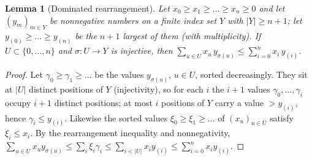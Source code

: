 \documentclass[11pt]{article}
\newtheorem{lemma}[theorem]{Lemma}
\theoremstyle{definition}
\theoremstyle{remark}
\begin{document}
\begin{lemma}[Dominated rearrangement]\label{lem:rearr}
Let $x_0\ge x_1\ge\dots\ge x_n\ge0$ and let $(y_m)_{m\in Y}$ be nonnegative numbers on a finite index set $Y$ with $|Y|\ge n+1$; let
$y_{(0)}\ge\dots\ge y_{(n)}$ be the $n+1$ largest of them (with multiplicity). If $U\subset\{0,\dots,n\}$ and $\sigma:U\to Y$ is injective, then
$\sum_{u\in U}x_u\,y_{\sigma(u)}\le\sum_{i=0}^nx_i\,y_{(i)}$.
\end{lemma}
\begin{proof}
Let $\gamma_0\ge\gamma_1\ge\dots$ be the values $y_{\sigma(u)}$, $u\in U$, sorted decreasingly. They sit at $|U|$ distinct positions of $Y$
(injectivity), so for each $i$ the $i+1$ values $\gamma_0,\dots,\gamma_i$ occupy $i+1$ distinct positions; at most $i$ positions of $Y$
carry a value $>y_{(i)}$, hence $\gamma_i\le y_{(i)}$. Likewise the sorted values $\xi_0\ge\xi_1\ge\dots$ of $(x_u)_{u\in U}$ satisfy
$\xi_i\le x_i$. By the rearrangement inequality and nonnegativity,
$\sum_{u\in U}x_uy_{\sigma(u)}\le\sum_i\xi_i\gamma_i\le\sum_{i<|U|}x_iy_{(i)}\le\sum_{i=0}^nx_iy_{(i)}$.
\end{proof}
\end{document}
